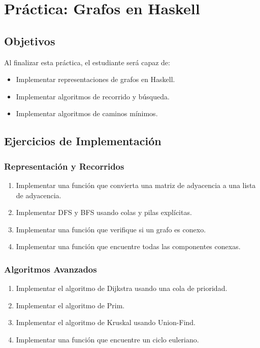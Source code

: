 \chapter{Práctica: Grafos en Haskell}

\section{Objetivos}
Al finalizar esta práctica, el estudiante será capaz de:
\begin{itemize}
  \item Implementar representaciones de grafos en Haskell.
  \item Implementar algoritmos de recorrido y búsqueda.
  \item Implementar algoritmos de caminos mínimos.
\end{itemize}

\section{Ejercicios de Implementación}

\subsection{Representación y Recorridos}
\begin{enumerate}
  \item Implementar una función que convierta una matriz de adyacencia a una lista de adyacencia.
  \item Implementar DFS y BFS usando colas y pilas explícitas.
  \item Implementar una función que verifique si un grafo es conexo.
  \item Implementar una función que encuentre todas las componentes conexas.
\end{enumerate}

\subsection{Algoritmos Avanzados}
\begin{enumerate}
  \item Implementar el algoritmo de Dijkstra usando una cola de prioridad.
  \item Implementar el algoritmo de Prim.
  \item Implementar el algoritmo de Kruskal usando Union-Find.
  \item Implementar una función que encuentre un ciclo euleriano.
\end{enumerate}

